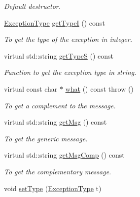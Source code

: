 \begin{DoxyCompactItemize}
\begin{DoxyCompactList}\small\item\em Default destructor. \item\end{DoxyCompactList}\item 
\hyperlink{classVishnuException_ad9de1e07d1e54a454cd2f7f3883de001}{ExceptionType} \hyperlink{classVishnuException_a4b9c5215a32d42e53655085a5bd121e3}{getTypeI} () const 
\begin{DoxyCompactList}\small\item\em To get the type of the exception in integer. \item\end{DoxyCompactList}\item 
virtual std::string \hyperlink{classVishnuException_ab9704ae9184fd6b786effbdf43c8db75}{getTypeS} () const 
\begin{DoxyCompactList}\small\item\em Function to get the exception type in string. \item\end{DoxyCompactList}\item 
virtual const char $\ast$ \hyperlink{classVishnuException_a19def10d113f98946265a3b384188443}{what} () const   throw ()
\begin{DoxyCompactList}\small\item\em To get a complement to the message. \item\end{DoxyCompactList}\item 
virtual std::string \hyperlink{classVishnuException_ae3720dc2e42b83a13a9c7f9eb3b63252}{getMsg} () const 
\begin{DoxyCompactList}\small\item\em To get the generic message. \item\end{DoxyCompactList}\item 
virtual std::string \hyperlink{classVishnuException_a50e5c8848325997584a6325fd69ada0c}{getMsgComp} () const 
\begin{DoxyCompactList}\small\item\em To get the complementary message. \item\end{DoxyCompactList}\item 
void \hyperlink{classVishnuException_ae69576d59eb83823c728b0c3a4ee6e39}{setType} (\hyperlink{classVishnuException_ad9de1e07d1e54a454cd2f7f3883de001}{ExceptionType} t)

\end{DoxyCompactItemize}
